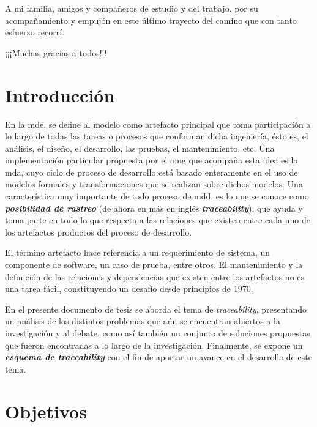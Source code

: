 \documentclass[a4paper,12pt,oneside,spanish]{book}
\begin{document}
\bigskip

A mi familia, amigos y compañeros de estudio y del trabajo, por su acompañamiento y empujón en este último trayecto del camino que con tanto esfuerzo recorrí.

\bigskip

¡¡¡Muchas gracias a todos!!!



\chapter{Introducción}


En la \gls{mde}, se define al modelo como artefacto principal que toma participación a lo largo de todas las tareas o procesos que conforman dicha ingeniería, ésto es, el análisis, el diseño, el desarrollo, las pruebas, el mantenimiento, etc. Una implementación particular propuesta por el \gls{omg} que acompaña esta idea es la \gls{mda}, cuyo ciclo de proceso de desarrollo está basado enteramente en el uso de modelos formales y transformaciones que se realizan sobre dichos modelos. Una característica muy importante de todo proceso de \gls{mdd}, es lo que se conoce como \textit{\textbf{posibilidad de rastreo}} (de ahora en más en inglés \textit{\textbf{traceability}}), que ayuda y toma parte en todo lo que respecta a las relaciones que existen entre cada uno de los artefactos productos del proceso de desarrollo.

El término artefacto hace referencia a un requerimiento de sistema, un componente de software, un caso de prueba, entre otros. El mantenimiento y la definición de las relaciones y dependencias que existen entre los artefactos no es una tarea fácil, constituyendo un desafío desde principios de 1970.

En el presente documento de tesis se aborda el tema de \textit{traceability}, presentando un análisis de los distintos problemas que aún se encuentran abiertos a la investigación y al debate, como así también un conjunto de soluciones propuestas que fueron encontradas a lo largo de la investigación. Finalmente, se expone un \textit{\textbf{esquema de traceability}} con el fin de aportar un avance en el desarrollo de este tema.




\chapter{Objetivos}
\end{document}
